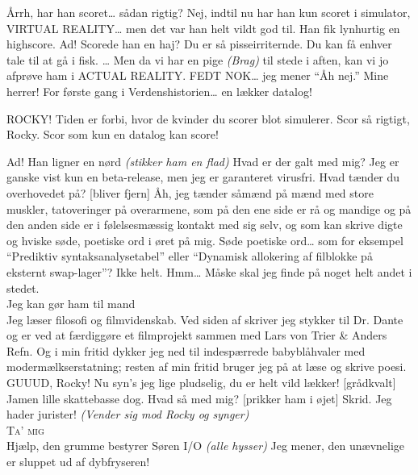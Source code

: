 \documentclass[10pt]{article}
\begin{document}
\begin{sketch}

   Årrh, har han scoret\ldots{} sådan rigtig?
    Nej, indtil nu har han kun scoret i simulator, VIRTUAL REALITY\ldots{} men det var
han helt vildt god til. Han fik lynhurtig en highscore.
   Ad! Scorede han en haj?
    Du er så pisseirriternde. Du kan få enhver tale til at gå i fisk.
\ldots{} Men da vi har en pige \emph{(Brag)} til stede i aften, kan vi jo afprøve ham i
ACTUAL REALITY.
  FEDT NOK\ldots{} jeg mener ``Åh nej.''
    Mine herrer! For første gang i Verdenshistorien\ldots{} en lækker datalog! 


    ROCKY! Tiden er forbi, hvor de kvinder du scorer blot simulerer.
Scor så rigtigt, Rocky. Scor som kun en datalog kan score!


  Ad! Han ligner en nørd \emph{(stikker ham en flad)}
  Hvad er der galt med mig? Jeg er ganske vist kun en beta-release,
men jeg er garanteret virusfri. Hvad tænder du overhovedet på?
  [bliver fjern] Åh, jeg tænder såmænd på mænd med store muskler,
tatoveringer på overarmene, som på den ene side er rå og mandige og på den
anden side er i følelsesmæssig kontakt med sig selv, og som kan skrive
digte og hviske søde, poetiske ord i øret på mig.
  Søde poetiske ord\ldots{} som for eksempel ``Prediktiv syntaksanalysetabel''
eller ``Dynamisk allokering af filblokke på eksternt swap-lager''?
  Ikke helt.
  Hmm\ldots{} Måske skal jeg finde på noget helt andet i stedet.
\\
 Jeg kan gør ham til mand
\\
     Jeg læser filosofi og filmvidenskab. Ved siden af skriver
jeg stykker til Dr. Dante og er ved at færdiggøre et filmprojekt sammen med
Lars von Trier \& Anders Refn. Og i min fritid dykker jeg ned til
indespærrede babyblåhvaler med modermælkserstatning; resten af min fritid
bruger jeg på at læse og skrive poesi.
  GUUUD, Rocky! Nu syn's jeg lige pludselig, du er helt vild lækker!
   [grådkvalt] Jamen lille skattebasse dog. Hvad så med mig?
  [prikker ham i øjet] Skrid. Jeg hader jurister! \emph{(Vender sig mod
Rocky og synger)}
\\
 \textsc{Ta' mig}
\\
   Hjælp, den grumme bestyrer Søren I/O \emph{(alle hysser)} Jeg mener, den
unævnelige er sluppet ud af dybfryseren!


\end{sketch}
\end{document}
